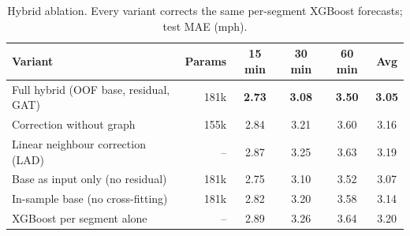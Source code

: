 \begin{table}[t]
\centering
\caption{Hybrid ablation. Every variant corrects the same per-segment XGBoost forecasts; test MAE (mph).}
\label{tab:p2abl_hybrid}
\setlength{\tabcolsep}{3.5pt}
\begin{tabular}{lrcccc}
\toprule
Variant & Params & 15 min & 30 min & 60 min & Avg \\
\midrule
Full hybrid (OOF base, residual, GAT) & 181k & \textbf{2.73} & \textbf{3.08} & \textbf{3.50} & \textbf{3.05} \\
Correction without graph & 155k & 2.84 & 3.21 & 3.60 & 3.16 \\
Linear neighbour correction (LAD) & -- & 2.87 & 3.25 & 3.63 & 3.19 \\
Base as input only (no residual) & 181k & 2.75 & 3.10 & 3.52 & 3.07 \\
In-sample base (no cross-fitting) & 181k & 2.82 & 3.20 & 3.58 & 3.14 \\
XGBoost per segment alone & -- & 2.89 & 3.26 & 3.64 & 3.20 \\
\bottomrule
\end{tabular}
\end{table}